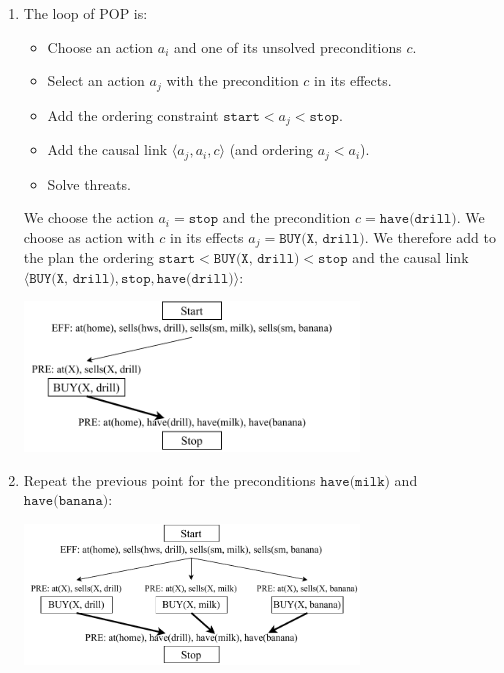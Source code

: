 \begin{example}
\begin{enumerate}
        \item The loop of POP is:
            \begin{itemize}
                \item Choose an action $a_i$ and one of its unsolved preconditions $c$. 
                \item Select an action $a_j$ with the precondition $c$ in its effects.
                \item Add the ordering constraint $\texttt{start} < a_j < \texttt{stop}$.
                \item Add the causal link $\langle a_j, a_i, c \rangle$ (and ordering $a_j < a_i$).
                \item Solve threats.
            \end{itemize}
        
            We choose the action $a_i = \texttt{stop}$ and the precondition $c = \texttt{have(drill)}$.
            We choose as action with $c$ in its effects $a_j = \texttt{BUY(X, drill)}$.
            We therefore add to the plan the ordering $\texttt{start} < \texttt{BUY(X, drill)} < \texttt{stop}$ and
            the causal link $\langle \texttt{BUY(X, drill)}, \texttt{stop}, \texttt{have(drill)} \rangle$:
            \begin{center}
                \includegraphics[width=0.7\textwidth]{img/_pop_example2.pdf}
            \end{center}

        \item Repeat the previous point for the preconditions $\texttt{have(milk)}$ and $\texttt{have(banana)}$:
            \begin{center}
                \includegraphics[width=0.7\textwidth]{img/_pop_example3.pdf}
            \end{center}


\end{enumerate}
\end{example}
